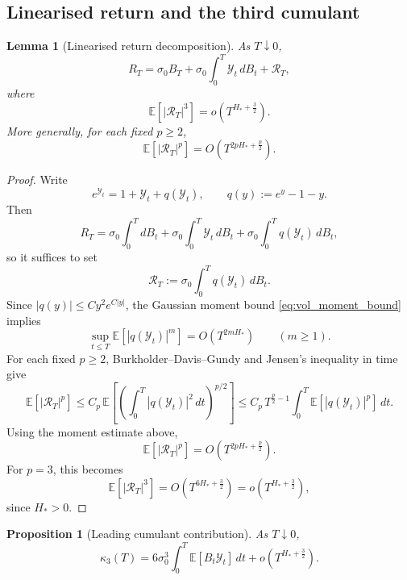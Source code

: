 \documentclass[11pt,a4paper]{amsart}
\theoremstyle{plain}
\newtheorem{lemma}[theorem]{Lemma}
\newtheorem{proposition}[theorem]{Proposition}
\theoremstyle{definition}
\theoremstyle{remark}
\newcommand{\EE}{\mathbb{E}}
\begin{document}
\subsection{Linearised return and the third cumulant}\label{subsec:third_cumulant}

\begin{lemma}[Linearised return decomposition]\label{lem:return_linearisation}
As $T\downarrow 0$,
\[
R_T
=
\sigma_0 B_T
+
\sigma_0 \int_0^T \mathcal Y_t\,dB_t
+
\mathcal R_T,
\]
where
\[
\EE\!\left[|\mathcal R_T|^3\right]
=
o\!\left(T^{H_*+\frac32}\right).
\]
More generally, for each fixed \(p\ge2\),
\[
\EE\!\left[|\mathcal R_T|^p\right]
=
O\!\left(T^{2pH_*+\frac p2}\right).
\]
\end{lemma}

\begin{proof}
Write
\[
e^{\mathcal Y_t}=1+\mathcal Y_t+q(\mathcal Y_t),
\qquad
q(y):=e^y-1-y.
\]
Then
\[
R_T
=
\sigma_0\int_0^T dB_t
+
\sigma_0\int_0^T \mathcal Y_t\,dB_t
+
\sigma_0\int_0^T q(\mathcal Y_t)\,dB_t,
\]
so it suffices to set
\[
\mathcal R_T:=\sigma_0\int_0^T q(\mathcal Y_t)\,dB_t.
\]
Since $|q(y)|\le C y^2 e^{C|y|}$, the Gaussian moment bound \eqref{eq:vol_moment_bound} implies
\[
\sup_{t\le T}\EE[|q(\mathcal Y_t)|^m]=O(T^{2mH_*})
\qquad (m\ge1).
\]
For each fixed \(p\ge2\), Burkholder--Davis--Gundy and Jensen's inequality in time give
\[
\EE[|\mathcal R_T|^p]
\le
C_p\,\EE\!\left[\left(\int_0^T |q(\mathcal Y_t)|^2\,dt\right)^{p/2}\right]
\le
C_p\,T^{\frac p2-1}\int_0^T \EE[|q(\mathcal Y_t)|^p]\,dt.
\]
Using the moment estimate above,
\[
\EE[|\mathcal R_T|^p]
=
O\!\left(T^{2pH_*+\frac p2}\right).
\]
For \(p=3\), this becomes
\[
\EE[|\mathcal R_T|^3]
=
O\!\left(T^{6H_*+\frac32}\right)
=
o\!\left(T^{H_*+\frac32}\right),
\]
since \(H_*>0\).
\end{proof}

\begin{proposition}[Leading cumulant contribution]\label{prop:third_cumulant}
As $T\downarrow0$,
\begin{equation}\label{eq:kappa3_leading}
\kappa_3(T)
=
6\sigma_0^3 \int_0^T \EE[B_t\mathcal Y_t]\,dt
+
o\!\left(T^{H_*+\frac32}\right).
\end{equation}
\end{proposition}
\end{document}
